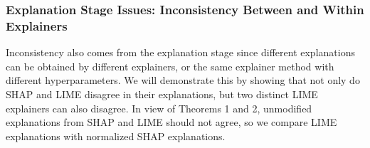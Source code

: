 \documentclass[mnsc,blindrev]{informs3}
\begin{document}
    
        
        
    
    
        
        
        \subsubsection{Explanation Stage Issues: Inconsistency Between and Within Explainers}
            \label{sec:conflict_between_within}
                Inconsistency also comes from the explanation stage since
                different explanations can be obtained by different explainers, or the same explainer method with different hyperparameters.
                We will demonstrate this by showing that not only do SHAP and LIME disagree in their explanations, but two distinct LIME explainers can also disagree. In view of Theorems 1 and 2, unmodified explanations from SHAP and LIME should not agree, so we compare LIME explanations with normalized SHAP explanations. 
                
\end{document}

